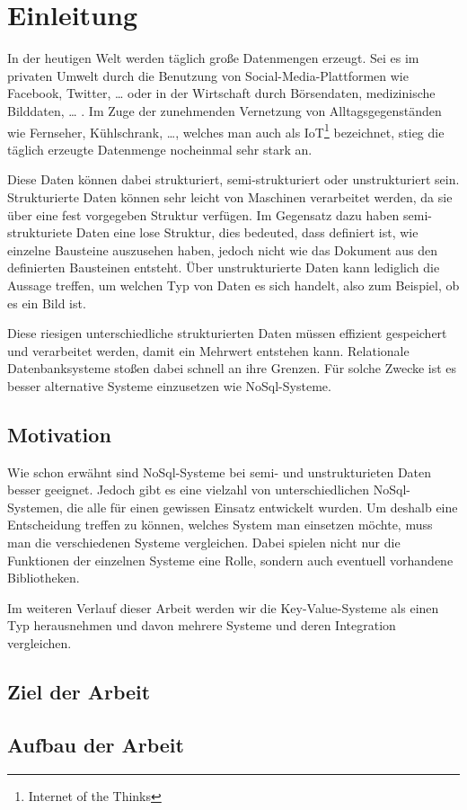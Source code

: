 \chapter{Einleitung}

In der heutigen Welt werden täglich große Datenmengen erzeugt. Sei es im
privaten Umwelt durch die Benutzung von Social-Media-Plattformen wie Facebook,
Twitter, \ldots{} oder in der Wirtschaft durch Börsendaten, medizinische
Bilddaten, \ldots{} . Im Zuge der zunehmenden Vernetzung von
Alltagsgegenständen wie Fernseher, Kühlschrank, \ldots{}, welches man auch als
IoT\footnote{Internet of the Thinks} bezeichnet, stieg die täglich erzeugte
Datenmenge nocheinmal sehr stark an.

Diese Daten können dabei strukturiert, semi-strukturiert oder unstrukturiert
sein. Strukturierte Daten können sehr leicht von Maschinen verarbeitet werden,
da sie über eine fest vorgegeben Struktur verfügen. Im Gegensatz dazu haben
semi-strukturiete Daten eine lose Struktur, dies bedeuted, dass definiert ist,
wie einzelne Bausteine auszusehen haben, jedoch nicht wie das Dokument aus den
definierten Bausteinen entsteht. Über unstrukturierte Daten kann lediglich die
Aussage treffen, um welchen Typ von Daten es sich handelt, also zum Beispiel,
ob es ein Bild ist.

Diese riesigen unterschiedliche strukturierten Daten müssen effizient
gespeichert und verarbeitet werden, damit ein Mehrwert entstehen kann.
Relationale Datenbanksysteme stoßen dabei schnell an ihre Grenzen. Für solche
Zwecke ist es besser alternative Systeme einzusetzen wie NoSql-Systeme.

\section{Motivation}

Wie schon erwähnt sind NoSql-Systeme bei semi- und unstrukturieten Daten besser
geeignet. Jedoch gibt es eine vielzahl von unterschiedlichen NoSql-Systemen,
die alle für einen gewissen Einsatz entwickelt wurden. Um deshalb eine
Entscheidung treffen zu können, welches System man einsetzen möchte, muss man
die verschiedenen Systeme vergleichen. Dabei spielen nicht nur die Funktionen
der einzelnen Systeme eine Rolle, sondern auch eventuell vorhandene
Bibliotheken.

Im weiteren Verlauf dieser Arbeit werden wir die Key-Value-Systeme als einen
Typ herausnehmen und davon mehrere Systeme und deren Integration vergleichen.

\section{Ziel der Arbeit}
\section{Aufbau der Arbeit}
